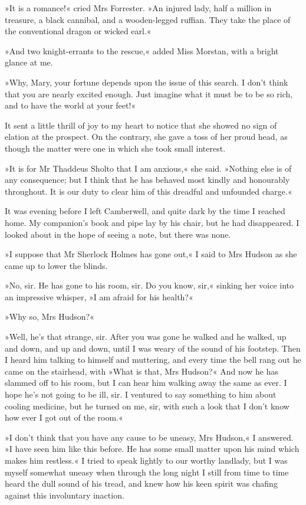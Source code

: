 »It is a romance!« cried Mrs Forrester. »An injured lady, half a million in treasure, a black cannibal, and a wooden-legged ruffian. They take the place of the conventional dragon or wicked earl.«

»And two knight-errants to the rescue,« added Miss Morstan, with a bright glance at me.

»Why, Mary, your fortune depends upon the issue of this search. I don't think that you are nearly excited enough. Just imagine what it must be to be so rich, and to have the world at your feet!«

It sent a little thrill of joy to my heart to notice that she showed no sign of elation at the prospect. On the contrary, she gave a toss of her proud head, as though the matter were one in which she took small interest.

»It is for Mr Thaddeus Sholto that I am anxious,« she said. »Nothing else is of any consequence; but I think that he has behaved most kindly and honourably throughout. It is our duty to clear him of this dreadful and unfounded charge.«

It was evening before I left Camberwell, and quite dark by the time I reached home. My companion's book and pipe lay by his chair, but he had disappeared. I looked about in the hope of seeing a note, but there was none.

»I suppose that Mr Sherlock Holmes has gone out,« I said to Mrs Hudson as she came up to lower the blinds.

»No, sir. He has gone to his room, sir. Do you know, sir,« sinking her voice into an impressive whisper, »I am afraid for his health?«

»Why so, Mrs Hudson?«

»Well, he's that strange, sir. After you was gone he walked and he walked, up and down, and up and down, until I was weary of the sound of his footstep. Then I heard him talking to himself and muttering, and every time the bell rang out he came on the stairhead, with »What is that, Mrs Hudson?« And now he has slammed off to his room, but I can hear him walking away the same as ever. I hope he's not going to be ill, sir. I ventured to say something to him about cooling medicine, but he turned on me, sir, with such a look that I don't know how ever I got out of the room.«

»I don't think that you have any cause to be uneasy, Mrs Hudson,« I answered. »I have seen him like this before. He has some small matter upon his mind which makes him restless.« I tried to speak lightly to our worthy landlady, but I was myself somewhat uneasy when through the long night I still from time to time heard the dull sound of his tread, and knew how his keen spirit was chafing against this involuntary inaction.

